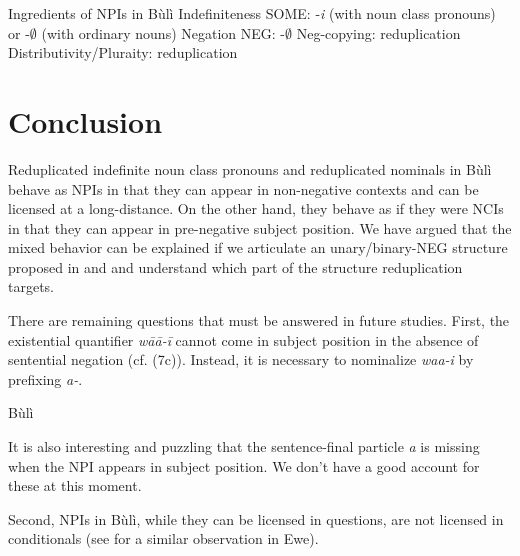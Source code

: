 \documentclass[output=paper,colorlinks,citecolor=brown]{langscibook}
\begin{document}
\ea Ingredients of NPIs in Bùlì
\ea Indefiniteness SOME: -\textit{i} (with noun class pronouns) or -$\emptyset$ (with ordinary nouns)
\ex Negation NEG: -$\emptyset$
\ex Neg-copying: reduplication
\ex Distributivity/Pluraity: reduplication
\z
\z

\section{Conclusion}

Reduplicated indefinite noun class pronouns and reduplicated nominals in Bùlì behave as NPIs in that they can appear in non-negative contexts and can be licensed at a long-distance. On the other hand, they behave as if they were NCIs in that they can appear in pre-negative subject position. We have argued that the mixed behavior can be explained if we articulate an unary/binary-NEG structure proposed in \cite{CollinsPostal2014} and \cite{CollinsEtAl2017} and understand which part of the structure reduplication targets.

There are remaining questions that must be answered in future studies. First, the existential quantifier \textit{wāā-ī} cannot come in subject position in the absence of sentential negation (cf. (7c)). Instead, it is necessary to nominalize \textit{waa-i} by prefixing \textit{a-}.

\ea Bùlì\\
\ea[]{
\gll Wāā-ī *(àn) ch\v{e}ng Wīāgā. \\
\textsc{nc}-i \textsc{neg} go Wiaga \\
\glt `Someone didn't go to Wiaga/No one went to Wiaga.'}
\z
\z

It is also interesting and puzzling that the sentence-final particle \textit{a} is missing when the NPI appears in subject position. We don't have a good account for these at this moment.

Second, NPIs in Bùlì, while they can be licensed in questions, are not licensed in conditionals (see \citealt{CollinsEtAl2017} for a similar observation in Ewe).
\end{document}
